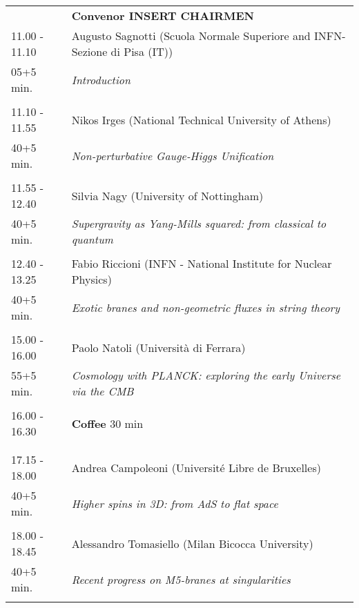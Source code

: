 \begin{longtable}{p{3cm}p{13cm}}
&\hfill {\bf Convenor INSERT CHAIRMEN }\\ 
11.00 - 11.10 & Augusto Sagnotti (Scuola Normale Superiore and INFN-Sezione di Pisa (IT))\\ 
05+5 min. & {\it Introduction}\\ 
 & \\ 
11.10 - 11.55 & Nikos Irges (National Technical University of Athens)\\ 
40+5 min. & {\it Non-perturbative Gauge-Higgs Unification}\\ 
 & \\ 
11.55 - 12.40 & Silvia Nagy (University of Nottingham)\\ 
40+5 min. & {\it Supergravity as Yang-Mills squared: from classical to quantum}\\ 
 & \\ 
12.40 - 13.25 & Fabio Riccioni (INFN - National Institute for Nuclear Physics)\\ 
40+5 min. & {\it Exotic branes and non-geometric fluxes in string theory}\\ 
 & \\ 
15.00 - 16.00 & Paolo Natoli (Università di Ferrara)\\ 
55+5 min. & {\it Cosmology with PLANCK: exploring the early Universe via the CMB}\\ 
 & \\ 
16.00 - 16.30 & {\bf Coffee} \hfill 30 min \\ 
 & \\ 
 & \\ 
17.15 - 18.00 & Andrea Campoleoni (Université Libre de Bruxelles)\\ 
40+5 min. & {\it Higher spins in 3D: from AdS to flat space}\\ 
 & \\ 
18.00 - 18.45 & Alessandro Tomasiello (Milan Bicocca University)\\ 
40+5 min. & {\it Recent progress on M5-branes at singularities}\\ 
 & \\ 
\end{longtable}

